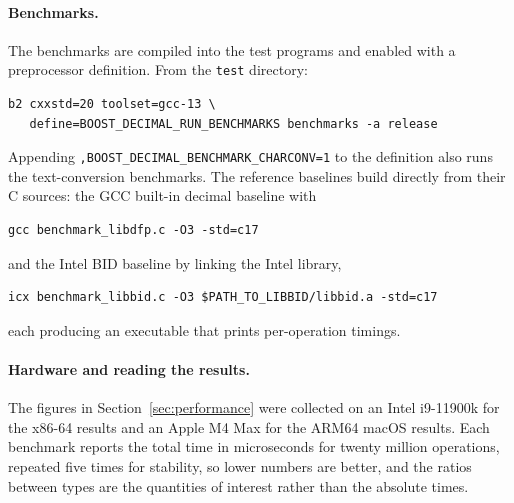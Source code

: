 \documentclass[acmsmall]{acmart}
\begin{document}
\paragraph{Benchmarks.}
The benchmarks are compiled into the test programs and enabled with a preprocessor
definition. From the \texttt{test} directory:
\begin{verbatim}
b2 cxxstd=20 toolset=gcc-13 \
   define=BOOST_DECIMAL_RUN_BENCHMARKS benchmarks -a release
\end{verbatim}
Appending \texttt{,BOOST\_DECIMAL\_BENCHMARK\_CHARCONV=1} to the definition also runs the
text-conversion benchmarks. The reference baselines build directly from their C sources:
the GCC built-in decimal baseline with
\begin{verbatim}
gcc benchmark_libdfp.c -O3 -std=c17
\end{verbatim}
and the Intel BID baseline by linking the Intel library,
\begin{verbatim}
icx benchmark_libbid.c -O3 $PATH_TO_LIBBID/libbid.a -std=c17
\end{verbatim}
each producing an executable that prints per-operation timings.

\paragraph{Hardware and reading the results.}
The figures in Section~\ref{sec:performance} were collected on an Intel i9-11900k for the
x86-64 results and an Apple M4 Max for the ARM64 macOS results. Each benchmark reports the
total time in microseconds for twenty million operations, repeated five times for
stability, so lower numbers are better, and the ratios between types are the quantities of
interest rather than the absolute times.
\end{document}
